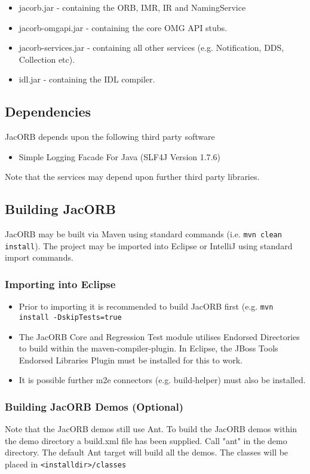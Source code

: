 \begin{itemize}
\item jacorb.jar          - containing the ORB, IMR, IR and NamingService
\item jacorb-omgapi.jar   - containing the core OMG API stubs.
\item jacorb-services.jar - containing all other services (e.g. Notification, DDS, Collection etc).
\item idl.jar             - containing the IDL compiler.
\end{itemize}

\subsection{Dependencies}

JacORB depends upon the following third party software
\begin{itemize}
\item Simple Logging Facade For Java (SLF4J Version 1.7.6)
\end{itemize}

Note that the services may depend upon further third party libraries.

\subsection{Building JacORB}
\label{sec:building}

JacORB may be built via Maven using standard commands (i.e. {\tt mvn clean install}). The
project may be imported into Eclipse or IntelliJ using standard import commands.

\subsubsection{Importing into Eclipse}
\begin{itemize}
\item Prior to importing it is recommended to build JacORB first (e.g. {\tt mvn install -DskipTests=true}
\item The JacORB Core and Regression Test module utilises Endorsed Directories to build within the maven-compiler-plugin. In Eclipse, the JBoss Tools Endorsed Libraries Plugin must be installed for this to work.
\item It is possible further m2e connectors (e.g. build-helper) must also be installed.
\end{itemize}

\subsubsection{Building JacORB Demos (Optional)}
Note that the JacORB demos still use Ant. To build the JacORB demos within the
demo directory a build.xml file has been supplied. Call "ant" in the demo directory.
The default Ant target will build all the demos. The classes will be placed
in {\tt <installdir>/classes}

